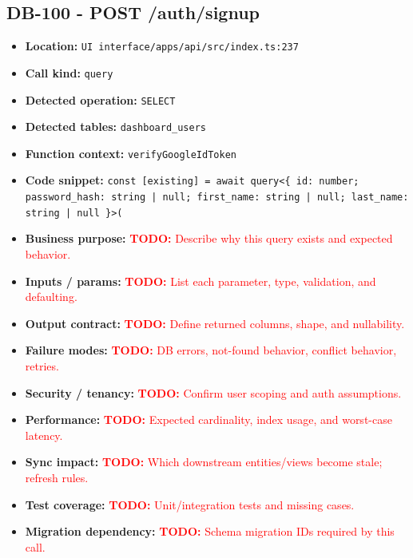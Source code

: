 \documentclass[11pt]{article}
\newcommand{\todoitem}[1]{\textcolor{red}{\textbf{TODO:} #1}}
\begin{document}
\subsection{DB-100 - POST /auth/signup}
\begin{itemize}[leftmargin=1.5em]
\item \textbf{Location:} \texttt{UI interface/apps/api/src/index.ts:237}
\item \textbf{Call kind:} \texttt{query}
\item \textbf{Detected operation:} \texttt{SELECT}
\item \textbf{Detected tables:} \texttt{dashboard\_users}
\item \textbf{Function context:} \texttt{verifyGoogleIdToken}
\item \textbf{Code snippet:} \texttt{const [existing] = await query<\{ id: number; password\_hash: string | null; first\_name: string | null; last\_name: string | null \}>(}
\item \textbf{Business purpose:} \todoitem{Describe why this query exists and expected behavior.}
\item \textbf{Inputs / params:} \todoitem{List each parameter, type, validation, and defaulting.}
\item \textbf{Output contract:} \todoitem{Define returned columns, shape, and nullability.}
\item \textbf{Failure modes:} \todoitem{DB errors, not-found behavior, conflict behavior, retries.}
\item \textbf{Security / tenancy:} \todoitem{Confirm user scoping and auth assumptions.}
\item \textbf{Performance:} \todoitem{Expected cardinality, index usage, and worst-case latency.}
\item \textbf{Sync impact:} \todoitem{Which downstream entities/views become stale; refresh rules.}
\item \textbf{Test coverage:} \todoitem{Unit/integration tests and missing cases.}
\item \textbf{Migration dependency:} \todoitem{Schema migration IDs required by this call.}
\end{itemize}
\end{document}
